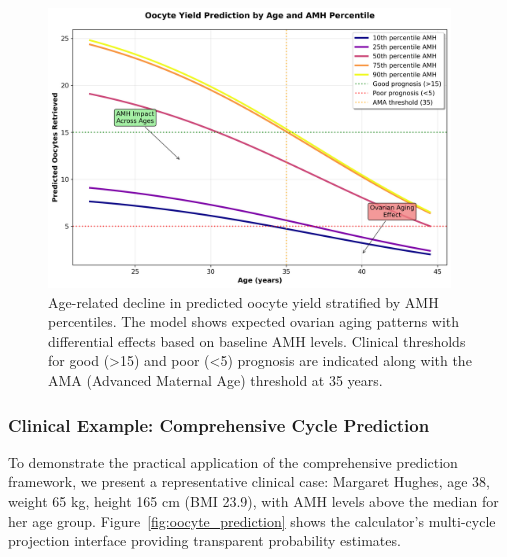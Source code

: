 \begin{figure}[H]
    \centering
    \includegraphics[width=0.95\textwidth]{figures/calculator_age_oocytes.png}
    \caption{Age-related decline in predicted oocyte yield stratified by AMH percentiles. The model shows expected ovarian aging patterns with differential effects based on baseline AMH levels. Clinical thresholds for good (>15) and poor (<5) prognosis are indicated along with the AMA (Advanced Maternal Age) threshold at 35 years.}
    \label{fig:calculator_age}
\end{figure}

\subsubsection{Clinical Example: Comprehensive Cycle Prediction}

To demonstrate the practical application of the comprehensive prediction framework, we present a representative clinical case: Margaret Hughes, age 38, weight 65 kg, height 165 cm (BMI 23.9), with AMH levels above the median for her age group. Figure~\ref{fig:oocyte_prediction} shows the calculator's multi-cycle projection interface providing transparent probability estimates.

